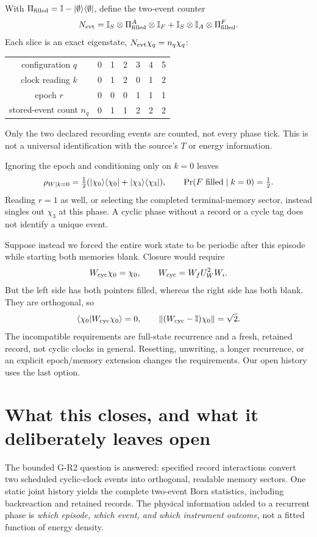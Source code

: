 \documentclass[11pt,a4paper]{article}
\newcommand{\id}{\mathbb I}
\newcommand{\ket}[1]{|#1\rangle}
\newcommand{\bra}[1]{\langle#1|}
\newcommand{\pr}[1]{\ket{#1}\bra{#1}}
\begin{document}
With $\Pi_{\rm filled}=\id-\pr\emptyset$, define the two-event counter
\begin{equation}
 N_{\rm evt}=\id_S\otimes\Pi_{\rm filled}^A\otimes\id_F
            +\id_S\otimes\id_A\otimes\Pi_{\rm filled}^F .
\end{equation}
Each slice is an exact eigenstate, $N_{\rm evt}\chi_q=n_q\chi_q$:
\begin{center}
\begin{tabular}{c*{6}{c}}
\toprule
configuration $q$&0&1&2&3&4&5\\
clock reading $k$&0&1&2&0&1&2\\
epoch $r$&0&0&0&1&1&1\\
stored-event count $n_q$&0&1&1&2&2&2\\
\bottomrule
\end{tabular}
\end{center}
Only the two declared recording events are counted, not every phase
tick. This is not a universal identification with the source's $T$
or energy information.

Ignoring the epoch and conditioning only on $k=0$ leaves
\begin{equation}
 \rho_{W\mid k=0}=\tfrac12
     (\pr{\chi_0}+\pr{\chi_3}),\qquad
 \Pr(F\ {\rm filled}\mid k=0)=\tfrac12 .
\end{equation}
Reading $r=1$ as well, or selecting the completed terminal-memory
sector, instead singles out $\chi_3$ at this phase. A cyclic phase
without a record or a cycle tag does not identify a unique event.

Suppose instead we forced the entire work state to be periodic after
this episode while starting both memories blank. Closure would require
\begin{equation}
 W_{\rm cyc}\chi_0=\chi_0,\qquad W_{\rm cyc}=W_fU_W^2W_i .
\end{equation}
But the left side has both pointers filled, whereas the right side has
both blank. They are orthogonal, so
\begin{equation}
 \langle\chi_0|W_{\rm cyc}\chi_0\rangle=0,\qquad
 \|(W_{\rm cyc}-\id)\chi_0\|=\sqrt2 .
\end{equation}
The incompatible requirements are full-state recurrence and a fresh,
retained record, not cyclic clocks in general. Resetting, unwriting,
a longer recurrence, or an explicit epoch/memory extension changes
the requirements. Our open history uses the last option.

\newpage
\section{What this closes, and what it deliberately leaves open}
The bounded G-R2 question is answered: specified record interactions
convert two scheduled cyclic-clock events into orthogonal, readable
memory sectors. One static joint history yields the complete
two-event Born statistics, including backreaction and retained records.
The physical information added to a recurrent phase is
\emph{which episode, which event, and which instrument outcome},
not a fitted function of energy density.
\end{document}
